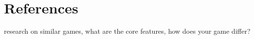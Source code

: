 \chapter{References} 
research on similar games, what are the core features, how does your game differ?
